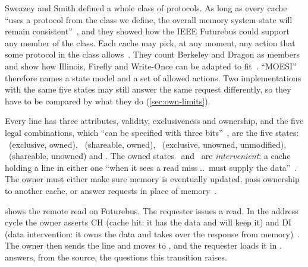 Sweazey and Smith defined a whole class of protocols. As
long as every cache ``uses a protocol from the class we define, the overall memory
system state will remain consistent''~\cite[p.~415]{sweazey1986moesi}, and they
showed how the IEEE Futurebus could support any member of the class. Each cache
may pick, at any moment, any action that some protocol in the class
allows~\cite[abstract]{sweazey1986moesi}. They count Berkeley and Dragon as members
and show how Illinois, Firefly and Write-Once can be adapted to
fit~\cite[abstract]{sweazey1986moesi}. ``MOESI'' therefore names a state model and
a set of allowed actions. Two implementations with the same five states may still
answer the same request differently, so they have to be compared by what they do
(\cref{sec:own-limits}).

Every line has three attributes, validity, exclusiveness and ownership, and the
five legal combinations, which ``can be specified with three
bits''~\cite[p.~416]{sweazey1986moesi}, are the five states: \stM\ (exclusive,
owned), \stO\ (shareable, owned), \stE\ (exclusive, unowned, unmodified), \stS\
(shareable, unowned) and \stI. The owned states \stM\ and \stO\ are
\emph{intervenient}: a cache holding a line in either one ``when it sees a read
miss\,\ldots\ must supply the data''~\cite[pp.~418--419]{sweazey1986moesi}. The
owner must either make sure memory is eventually updated, pass ownership to
another cache, or answer requests in place of
memory~\cite[p.~417]{sweazey1986moesi}.

 shows the remote read on Futurebus. The requester issues
a read. In the address cycle the owner asserts \textsc{CH} (cache hit: it has the
data and will keep it) and \textsc{DI} (data intervention: it owns the data and
takes over the response from memory)~\cite[pp.~417--418]{sweazey1986moesi}. The
owner then sends the line and moves to \stO, and the requester loads it in \stS.
\Cref{tab:o-state-questions} answers, from the source, the questions this
transition raises.

